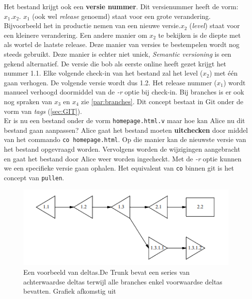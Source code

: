 Het bestand krijgt ook een \textbf{versie nummer}. Dit versienummer heeft de vorm: $x_1.x_2$. $x_1$ (ook wel \textit{release} genoemd) staat voor een grote verandering. Bijvoorbeeld het in productie nemen van een nieuwe versie.$x_2$ (\textit{level}) staat voor een kleinere verandering. Een andere manier om $x_2$ te bekijken is de diepte met als wortel de laatste release. Deze manier van versies te bestempelen wordt nog steeds gebruikt. Deze manier is echter niet uniek, \textit{Semantic versioning} is een gekend alternatief. De versie die bob als eerste online heeft gezet krijgt het nummer 1.1. Elke volgende check-in van het bestand zal het level ($x_2$) met één gaan verhogen. De volgende versie wordt dus 1.2. Het release nummer ($x_1$) wordt manueel verhoogd doormiddel van de \textit{-r} optie bij check-in. Bij branches is er ook nog spraken van $x_3$ en $x_4$ zie \ref{par:branches}. Dit concept bestaat in Git onder de vorm van \textit{tags} (\ref{sec:GIT}).\\

Er is nu een bestand onder de vorm \Verb+homepage.html.v+ maar hoe kan Alice nu dit bestand gaan aanpassen? Alice gaat het bestand moeten \textbf{uitchecken} door middel van het commando  \verb+co homepage.html+. Op die manier kan de nieuwste versie van het bestand opgevraagd worden. Vervolgens worden de wijzigingen aangebracht en gaat het bestand door Alice weer worden ingecheckt. Met de \textit{-r} optie kunnen we een specifieke versie gaan ophalen. Het equivalent van \verb+co+ binnen git is het concept van \verb+pullen+.\\

\begin{figure}
\label{fig:deltas}
\begin{center}
  	\includegraphics[scale=0.6]{deltas.png}
\end{center}
\caption[Voorbeeld van deltas.]{Een voorbeeld van deltas.De Trunk bevat een series van achterwaardse deltas terwijl alle branches enkel voorwaardse deltas bevatten. Grafiek afkomstig uit \textcite{Tichy85rcs}}
\end{figure}

